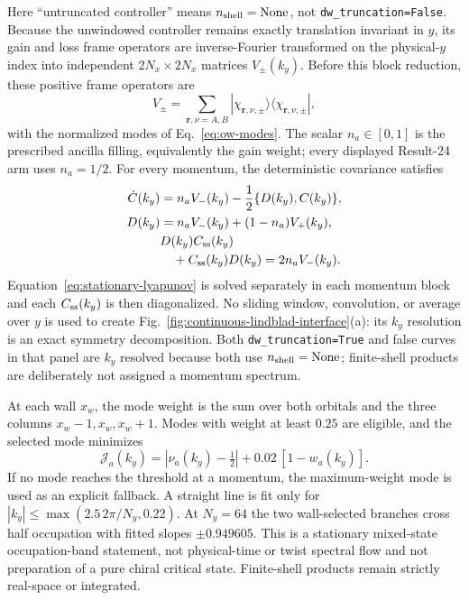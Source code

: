 \documentclass[aps,prb,twocolumn,floatfix,nofootinbib,superscriptaddress]{revtex4-2}
\begin{document}
Here ``untruncated controller'' means $n_{\rm shell}=\mathrm{None}$, not
\texttt{dw\_truncation=False}.  Because the unwindowed controller remains exactly
translation invariant in $y$, its gain and loss frame operators are inverse-Fourier
transformed on the physical-$y$ index into independent $2N_x\times2N_x$ matrices
$V_\pm(k_y)$.  Before this block reduction, these positive frame operators are
\begin{equation}
 V_\pm=\sum_{\boldsymbol r,\nu=A,B}
 |\chi_{\boldsymbol r,\nu,\pm}\rangle
 \langle\chi_{\boldsymbol r,\nu,\pm}|,
 \label{eq:mean-frame-operators}
\end{equation}
with the normalized modes of Eq.~\eqref{eq:ow-modes}.  The scalar
$n_a\in[0,1]$ is the prescribed ancilla filling, equivalently the gain weight; every
displayed Result-24 arm uses $n_a=1/2$.  For every momentum, the deterministic covariance satisfies
\begin{align}
 \dot C(k_y)&=n_aV_-(k_y)-\frac12\{D(k_y),C(k_y)\},
 \label{eq:mean-generator}\\
 D(k_y)&=n_aV_-(k_y)+(1-n_a)V_+(k_y),
 \label{eq:mean-damping}\\
 &D(k_y)C_{\rm ss}(k_y)\nonumber\\
 &\quad+C_{\rm ss}(k_y)D(k_y)=2n_aV_-(k_y).
 \label{eq:stationary-lyapunov}
\end{align}
Equation~\eqref{eq:stationary-lyapunov} is solved separately in each momentum block and
each $C_{\rm ss}(k_y)$ is then diagonalized.  No sliding window, convolution, or average
over $y$ is used to create Fig.~\ref{fig:continuous-lindblad-interface}(a): its
$k_y$ resolution is an exact symmetry decomposition.  Both
\texttt{dw\_truncation=True} and false curves in that panel are $k_y$ resolved because
both use $n_{\rm shell}=\mathrm{None}$; finite-shell products are deliberately not
assigned a momentum spectrum.

At each wall $x_w$, the mode weight is the sum over both orbitals and the three columns
$x_w-1,x_w,x_w+1$.  Modes with weight at least $0.25$ are eligible, and the selected mode
minimizes
\begin{equation}
 \mathcal J_a(k_y)=|\nu_a(k_y)-\tfrac12|
 +0.02\,[1-w_a(k_y)].
 \label{eq:mean-branch-selection}
\end{equation}
If no mode reaches the threshold at a momentum, the maximum-weight mode is used as an
explicit fallback.  A straight line is fit only for
$|k_y|\leq\max(2.5\,2\pi/N_y,0.22)$.  At $N_y=64$ the two wall-selected branches cross
half occupation with fitted slopes $\pm0.949605$.  This is a
stationary mixed-state occupation-band statement, not physical-time or twist spectral
flow and not preparation of a pure chiral critical state.  Finite-shell products remain
strictly real-space or integrated.
\end{document}
